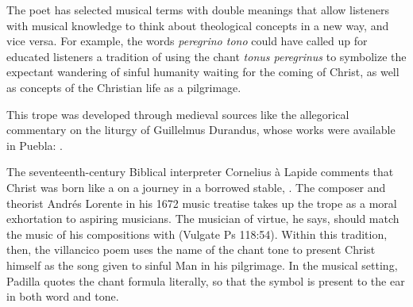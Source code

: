 The poet has selected musical terms with double meanings that allow listeners
with musical knowledge to think about theological concepts in a new way, and
vice versa.
For example, the words \emph{peregrino tono} could have called up for educated
listeners a tradition of using the chant \emph{tonus peregrinus} to symbolize the
expectant wandering of sinful humanity waiting for the coming of Christ, as well
as concepts of the Christian life as a pilgrimage.%
\begin{Footnote}
    This trope was developed through medieval sources like the allegorical
    commentary on the liturgy of Guillelmus Durandus, whose works were available
    in Puebla: \autocite[234]{Wright:Maze}.
\end{Footnote}
The seventeenth-century Biblical interpreter Cornelius à Lapide comments that
Christ was born like a   on a journey in
a borrowed stable, .
    \Autocites
    [884, on Jn 1:14:
    .]
    {Lapide:Gospels19C}
    [669, on Lk 2:5: 
    .] 
    {Lapide:Gospels19C}
The composer and theorist Andrés Lorente in his 1672 music treatise takes up the
 trope as a moral exhortation to aspiring musicians.
The musician of virtue, he says, should match the music of his compositions with
 (Vulgate Ps 118:54).
    \Autocite
    [609: .] 
    {Lorente:Porque}
Within this tradition, then, the villancico poem uses the name of the chant tone
to present Christ himself as the song given to sinful Man in his pilgrimage. 
In the musical setting, Padilla quotes the chant formula literally, so that the
symbol is present to the ear in both word and tone.

